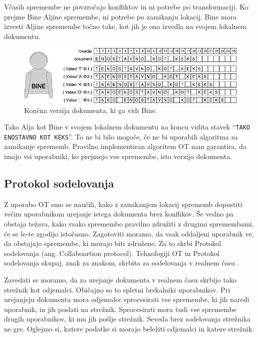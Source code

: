 \documentclass[a4paper, 12pt, twoside]{book}
\begin{document}
Včasih spremembe ne povzročajo konfliktov in ni potrebe po transformaciji. Ko prejme Bine Aljine spremembe, ni potrebe po zamikanju lokacij. Bine mora izvesti Aljine spremembe točno take, kot jih je ona izvedla na svojem lokalnem dokumentu.

\begin{figure}[placement h]
\begin{center}
\includegraphics[width=12cm]{ot6.png}
\end{center}
\caption{Končna verzija dokumenta, ki ga vidi Bine.}
\label{ot6}
\end{figure}

Tako Alja kot Bine v svojem lokalnem dokumentu na koncu vidita stavek “{\tt TAKO ENOSTAVNO KOT KEKS}”. To ne bi bilo mogoče, če ne bi uporabili algoritma za zamikanje sprememb. Pravilno implementiran algoritem OT nam garantira, da imajo vsi uporabniki, ko prejmejo vse spremembe, isto verzijo dokumenta.

\subsection{Protokol sodelovanja}
\label{subsec:ps}

Z uporabo OT smo se naučili, kako z zamikanjem lokacij sprememb dopustiti večim uporabnikom urejanje istega dokumenta brez konflikov. Še vedno pa obstaja težava, kako vsako spremembo pravilno združiti z drugimi spremembami, če se le-te zgodijo istočasno. Zagotoviti moramo, da vsak oddaljeni uporabnik ve, da obstajajo spremembe, ki morajo biti združene. Za to skrbi Protokol sodelovanja (ang. Collaboartion protocol). Tehnologiji OT in Protokol sodelovanja skupaj, znak za znakom, skrbita za sodelovanja v realnem času \cite{gdocs23}.

Zavedati se moramo, da za urejanje dokumenta v realnem času skrbijo tako strežnik kot odjemalci. Običajno so to spletni brskalniki uporabnikov. Pri urejanjeju dokumenta mora odjemalec sprocesirati vse spremembe, ki jih naredi uporabnik, in jih poslati na strežnik. Sprocesirati mora tudi vse spremembe drugih uporabnikov, ki mu jih pošlje strežnik. Seveda brez sodelovanja strežnika ne gre. Oglejmo si, katere podatke si morajo beležiti odjemalci in katere strežnik.
\end{document}
